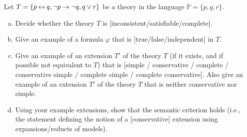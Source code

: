 \begin{problem}\label{problem:properties-of-theories}

    Let $T=\{p\mathbin{\leftrightarrow} q,\neg p\to\neg q,q\lor r\}$ be a theory in the language $\mathbb P=\{p,q,r\}$.
    \begin{enumerate}[(a)]
        \item Decide whether the theory $T$ is [inconsistent/satisfiable/complete].
        \item Give an example of a formula $\varphi$ that is [true/false/independent] in $T$.
        \item Give an example of an extension $T'$ of the theory $T$ (if it exists, and if possible not equivalent to $T$) that is [simple / conservative / complete / conservative simple / complete simple / complete conservative]. Also give an example of an extension $T'$ of the theory $T$ that is neither conservative nor simple.
        \item Using your example extensions, show that the semantic criterion holds (i.e., the statement defining the notion of a [conservative] extension using expansions/reducts of models).
    \end{enumerate}


\end{problem}
